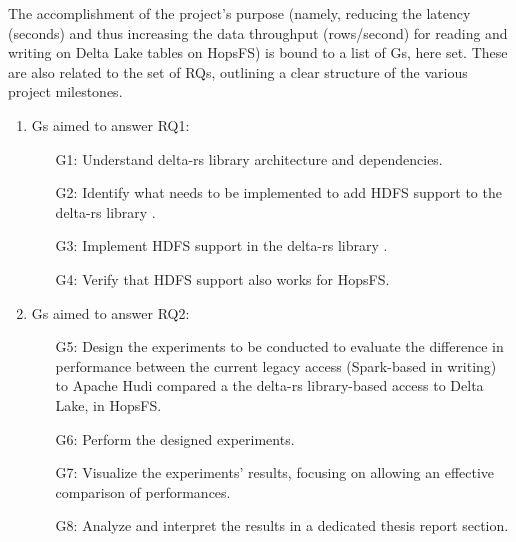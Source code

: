 The accomplishment of the project's purpose (namely, reducing the latency (seconds) and thus increasing the data throughput (rows/second) for reading and writing on Delta Lake tables on \gls{HopsFS}) is bound to a list of \glspl{G}, here set. These are also related to the set of \glspl{RQ}, outlining a clear structure of the various project milestones.

\begin{enumerate}
    \item \glspl{G} aimed to answer RQ1: 
        \begin{enumerate}
            \item[G1:] Understand delta-rs library \cite{DeltaioDeltars2024} architecture and dependencies.
            \item[G2:] Identify what needs to be implemented to add \gls{HDFS} support to the delta-rs library \cite{DeltaioDeltars2024}.  
            \item[G3:] Implement \gls{HDFS} support in the delta-rs library \cite{DeltaioDeltars2024}.
            \item[G4:] Verify that \gls{HDFS} support also works for \gls{HopsFS}.
        \end{enumerate}
    \item \glspl{G} aimed to answer RQ2:
        \begin{enumerate}
            \item[G5:] Design the experiments to be conducted to evaluate the difference in performance between the current legacy access (Spark-based in writing) to Apache Hudi compared a the delta-rs \cite{DeltaioDeltars2024} library-based access to Delta Lake, in \gls{HopsFS}. 
            \item[G6:] Perform the designed experiments.
            \item[G7:] Visualize the experiments' results, focusing on allowing an effective comparison of performances.
            \item[G8:] Analyze and interpret the results in a dedicated thesis report section.
        \end{enumerate}
\end{enumerate}

